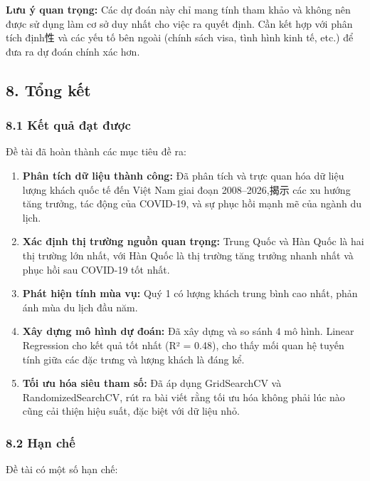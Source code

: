 \documentclass[11pt]{article}
\begin{document}
\textbf{Lưu ý quan trọng:} Các dự đoán này chỉ mang tính tham khảo và
không nên được sử dụng làm cơ sở duy nhất cho việc ra quyết định. Cần
kết hợp với phân tích định性 và các yếu tố bên ngoài (chính sách visa,
tình hình kinh tế, etc.) để đưa ra dự đoán chính xác hơn.

    \subsection{8. Tổng kết}\label{tux1ed5ng-kux1ebft}

\subsubsection{8.1 Kết quả đạt
được}\label{kux1ebft-quux1ea3-ux111ux1ea1t-ux111ux1b0ux1ee3c}

Đề tài đã hoàn thành các mục tiêu đề ra:

\begin{enumerate}
\def\labelenumi{\arabic{enumi}.}
\item
  \textbf{Phân tích dữ liệu thành công:} Đã phân tích và trực quan hóa
  dữ liệu lượng khách quốc tế đến Việt Nam giai đoạn 2008--2026,揭示 các
  xu hướng tăng trưởng, tác động của COVID-19, và sự phục hồi mạnh mẽ
  của ngành du lịch.
\item
  \textbf{Xác định thị trường nguồn quan trọng:} Trung Quốc và Hàn Quốc
  là hai thị trường lớn nhất, với Hàn Quốc là thị trường tăng trưởng
  nhanh nhất và phục hồi sau COVID-19 tốt nhất.
\item
  \textbf{Phát hiện tính mùa vụ:} Quý 1 có lượng khách trung bình cao
  nhất, phản ánh mùa du lịch đầu năm.
\item
  \textbf{Xây dựng mô hình dự đoán:} Đã xây dựng và so sánh 4 mô hình.
  Linear Regression cho kết quả tốt nhất (R² = 0.48), cho thấy mối quan
  hệ tuyến tính giữa các đặc trưng và lượng khách là đáng kể.
\item
  \textbf{Tối ưu hóa siêu tham số:} Đã áp dụng GridSearchCV và
  RandomizedSearchCV, rút ra bài viết rằng tối ưu hóa không phải lúc nào
  cũng cải thiện hiệu suất, đặc biệt với dữ liệu nhỏ.
\end{enumerate}

\subsubsection{8.2 Hạn chế}\label{hux1ea1n-chux1ebf}

Đề tài có một số hạn chế:
\end{document}
